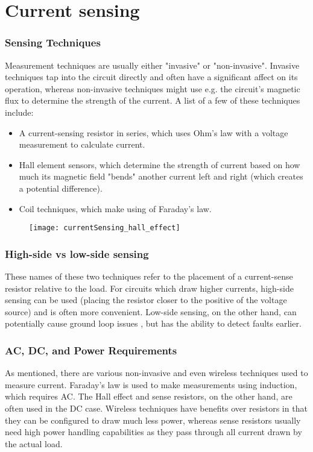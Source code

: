 \graphicspath{{content/1_literatureReview/figures/}}
\section{Current sensing}\label{sec:cursens}

\subsubsection{Sensing Techniques}\label{sec:cur_sum}
Measurement techniques are usually either "invasive" or "non-invasive". Invasive techniques tap into the circuit directly and often have a significant affect
on its operation, whereas non-invasive techniques might use e.g. the circuit's magnetic flux to determine the strength of the current.
A list of a few of these techniques \cite{currentSenseMethods} include:
\begin{itemize}
    \item A current-sensing resistor in series, which uses Ohm's law with a voltage measurement to calculate current.
    \item Hall element sensors, which determine the strength of current based on how much its magnetic field "bends" another current left and right (which creates a potential difference).
    \item Coil techniques, which make using of Faraday's law.
\end{itemize}

\begin{figure}[h!]
    \centering
    \texttt{[image: currentSensing\_hall\_effect]}
    \label{fig:hall-effect}
  \end{figure}

\subsubsection{High-side vs low-side sensing}\label{sec:cur_highlow}
These names of these two techniques refer to the placement of a current-sense resistor relative to the load. For circuits which draw higher currents, high-side sensing can be used
(placing the resistor closer to the positive of the voltage source) and is often more convenient. Low-side sensing, on the other hand, can potentially cause ground loop
issues \cite{currentSenseLowHighSide}, but has the ability to detect faults earlier.

\subsubsection{AC, DC, and Power Requirements}\label{sec:cur_acdc}
As mentioned, there are various non-invasive and even wireless techniques used to measure current. Faraday's law is used to make measurements using induction, which requires AC.
The Hall effect and sense resistors, on the other hand, are often used in the DC case. Wireless techniques have benefits over resistors in that they can be configured to draw much less power,
whereas sense resistors usually need high power handling capabilities as they pass through all current drawn by the actual load.
